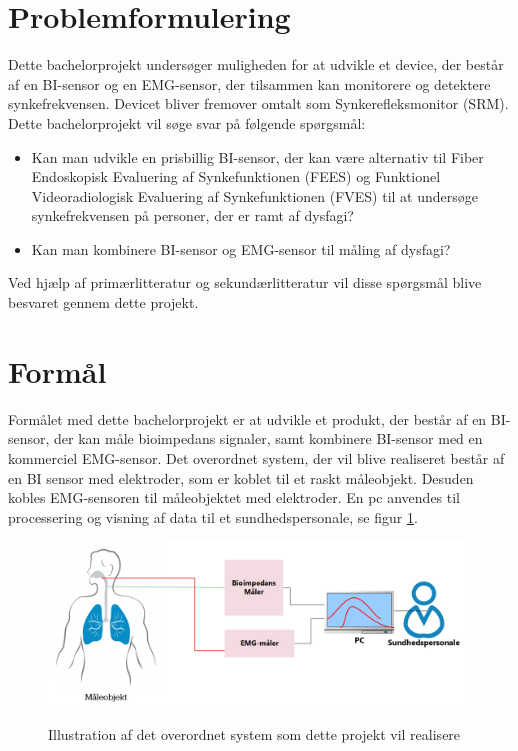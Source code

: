 \section{Problemformulering}

Dette bachelorprojekt undersøger muligheden for at udvikle et device, der består af en BI-sensor og en EMG-sensor, der tilsammen kan monitorere og detektere synkefrekvensen. Devicet bliver fremover omtalt som Synkerefleksmonitor (SRM). Dette bachelorprojekt vil søge svar på følgende spørgsmål: 

\begin{itemize}
\item Kan man udvikle en prisbillig BI-sensor, der kan være alternativ til Fiber Endoskopisk Evaluering af Synkefunktionen (FEES) og Funktionel Videoradiologisk Evaluering af Synkefunktionen (FVES) til at undersøge synkefrekvensen på personer, der er ramt af dysfagi?
\item Kan man kombinere BI-sensor og EMG-sensor til måling af dysfagi?


\end{itemize}
Ved hjælp af primærlitteratur og sekundærlitteratur vil disse spørgsmål blive besvaret gennem dette projekt. 
\pagebreak

\section{Formål}

Formålet med dette bachelorprojekt er at udvikle et produkt, der består af en BI-sensor, der kan måle bioimpedans signaler, samt kombinere BI-sensor med en kommerciel EMG-sensor. Det overordnet system, der vil blive realiseret består af en BI sensor med elektroder, som er koblet til et raskt måleobjekt. Desuden kobles EMG-sensoren til måleobjektet med elektroder. En pc anvendes til processering og visning af data til et sundhedspersonale, se figur \ref{KonceptuelDiagram}.  

\begin{figure}[H]
\centering
{\includegraphics[width=11cm]
{Figure/KonceptuelDiagram}}
\caption{Illustration af  det overordnet system som dette projekt vil realisere}
\label{KonceptuelDiagram}
\end{figure}


